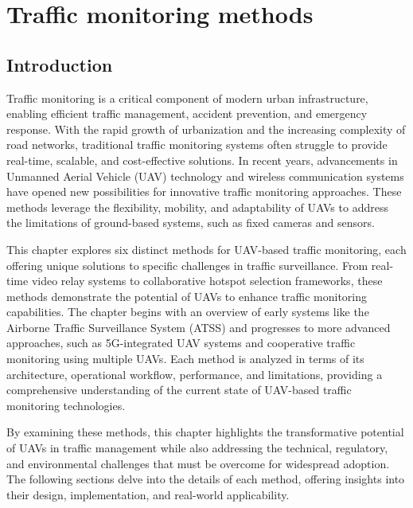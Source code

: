
\chapter{Traffic monitoring methods}


\section{Introduction}

Traffic monitoring is a critical component of modern urban infrastructure, enabling efficient traffic management, accident prevention, and emergency response. With the rapid growth of urbanization and the increasing complexity of road networks, traditional traffic monitoring systems often struggle to provide real-time, scalable, and cost-effective solutions. In recent years, advancements in Unmanned Aerial Vehicle (UAV) technology and wireless communication systems have opened new possibilities for innovative traffic monitoring approaches. These methods leverage the flexibility, mobility, and adaptability of UAVs to address the limitations of ground-based systems, such as fixed cameras and sensors.

\vspace{\baselineskip} %

This chapter explores six distinct methods for UAV-based traffic monitoring, each offering unique solutions to specific challenges in traffic surveillance. From real-time video relay systems to collaborative hotspot selection frameworks, these methods demonstrate the potential of UAVs to enhance traffic monitoring capabilities. The chapter begins with an overview of early systems like the Airborne Traffic Surveillance System (ATSS) and progresses to more advanced approaches, such as 5G-integrated UAV systems and cooperative traffic monitoring using multiple UAVs. Each method is analyzed in terms of its architecture, operational workflow, performance, and limitations, providing a comprehensive understanding of the current state of UAV-based traffic monitoring technologies.

\vspace{\baselineskip} %

By examining these methods, this chapter highlights the transformative potential of UAVs in traffic management while also addressing the technical, regulatory, and environmental challenges that must be overcome for widespread adoption. The following sections delve into the details of each method, offering insights into their design, implementation, and real-world applicability.


